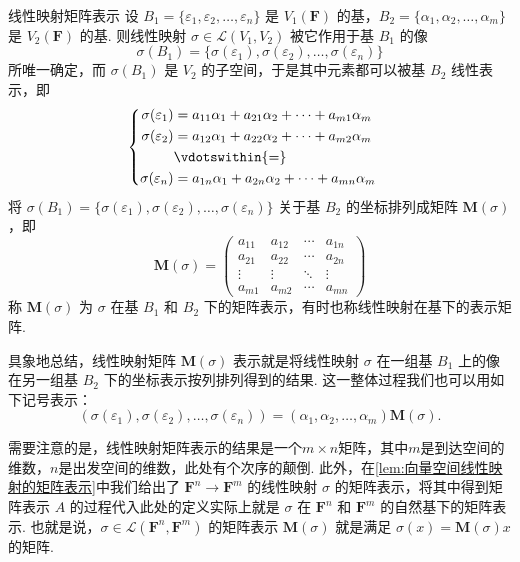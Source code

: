 \begin{definition}{}{线性映射矩阵表示}
    设 $B_1 = \{\varepsilon_1,\varepsilon_2,\ldots,\varepsilon_n\}$ 是 $V_1(\mathbf{F})$ 的基，$B_2 = \{\alpha_1,\alpha_2,\ldots,\alpha_m\}$ 是 $V_2(\mathbf{F})$ 的基. 则线性映射 $\sigma \in \mathcal{L}(V_1,V_2)$ 被它作用于基 $B_1$ 的像
    \[\sigma(B_1) = \{\sigma(\varepsilon_1),\sigma(\varepsilon_2),\ldots,\sigma(\varepsilon_n)\}\]
    所唯一确定，而 $\sigma(B_1)$ 是 $V_2$ 的子空间，于是其中元素都可以被基 $B_2$ 线性表示，即
    \[ \begin{cases} \begin{aligned}
                \sigma(\varepsilon_1) & = a_{11}\alpha_1+a_{21}\alpha_2+\cdots+a_{m1}\alpha_m \\
                \sigma(\varepsilon_2) & = a_{12}\alpha_1+a_{22}\alpha_2+\cdots+a_{m2}\alpha_m \\
                                      & \vdotswithin{=}                                       \\
                \sigma(\varepsilon_n) & = a_{1n}\alpha_1+a_{2n}\alpha_2+\cdots+a_{mn}\alpha_m
            \end{aligned} \end{cases} \]
    将 $\sigma(B_1)=\{\sigma(\varepsilon_1),\sigma(\varepsilon_2),\ldots,\sigma(\varepsilon_n)\}$ 关于基 $B_2$ 的坐标排列成矩阵 $\mathbf{M}(\sigma)$，即
    \[
        \mathbf{M}(\sigma)=\begin{pmatrix}
            a_{11} & a_{12} & \cdots & a_{1n} \\
            a_{21} & a_{22} & \cdots & a_{2n} \\
            \vdots & \vdots & \ddots & \vdots \\
            a_{m1} & a_{m2} & \cdots & a_{mn}
        \end{pmatrix}
    \]
    称 $\mathbf{M}(\sigma)$ 为 $\sigma$ 在基 $B_1$ 和 $B_2$ 下的矩阵表示，有时也称线性映射在基下的表示矩阵.
\end{definition}

具象地总结，线性映射矩阵 $\mathbf{M}(\sigma)$ 表示就是将线性映射 $\sigma$ 在一组基 $B_1$ 上的像在另一组基 $B_2$ 下的坐标表示按列排列得到的结果. 这一整体过程我们也可以用如下记号表示：
\begin{equation}\label{eq:7:线性映射矩阵表示}
    (\sigma(\varepsilon_1),\sigma(\varepsilon_2),\ldots,\sigma(\varepsilon_n))=(\alpha_1,\alpha_2,\ldots,\alpha_m)\mathbf{M}(\sigma).
\end{equation}

需要注意的是，线性映射矩阵表示的结果是一个$m\times n$矩阵，其中$m$是到达空间的维数，$n$是出发空间的维数，此处有个次序的颠倒. 此外，在\autoref{lem:向量空间线性映射的矩阵表示}中我们给出了 $\mathbf{F}^n \to \mathbf{F}^m$ 的线性映射 $\sigma$ 的矩阵表示，将其中得到矩阵表示 $A$ 的过程代入此处的定义实际上就是 $\sigma$ 在 $\mathbf{F}^n$ 和 $\mathbf{F}^m$ 的自然基下的矩阵表示. 也就是说，$\sigma \in \mathcal{L}(\mathbf{F}^n, \mathbf{F}^m)$ 的矩阵表示 $\mathbf{M}(\sigma)$ 就是满足 $\sigma(x) = \mathbf{M}(\sigma)x$ 的矩阵.

